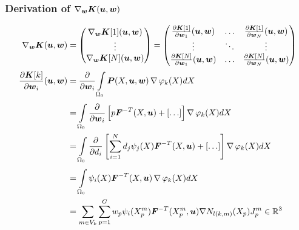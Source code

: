 \subsubsection{Derivation of $\nabla_{\vw}\vK(\vu,\vw)$}
\begin{align*}
	\nabla_{\vw}\vK(\vu,\vw) &= \m{\nabla_{\vw}\vK[1](\vu,\vw)\\ \vdots \\ \nabla_{\vw}\vK[N](\vu,\vw)}
	 = \m{\d{\vK[1]}{\vw_1}(\vu,\vw) & \ldots & \d{\vK[1]}{\vw_N}(\vu,\vw)\\
	 	\vdots & \ddots & \vdots\\
	   \d{\vK[N]}{\vw_1}(\vu,\vw) & \ldots & \d{\vK[N]}{\vw_N}(\vu,\vw)}\\
	\d{\vK[k]}{\vw_i}(\vu,\vw) &= \d{}{\vw_i} \intor\vP(X,\vu,\vw)\divergence\varphi_k(X) dX\\
		&=  \intor\d{}{\vw_i} \left[p\vF^{-T}(X,\vu) +[\ldots] \right] \divergence\varphi_k(X) dX\\
		&=  \intor\d{}{d_i} \left[\sumi d_j\psi_j(X)\vF^{-T}(X,\vu) +[\ldots] \right] \divergence\varphi_k(X) dX\\
		&=  \intor \psi_i(X)\vF^{-T}(X,\vu)\divergence\varphi_k(X) dX\\
		&= \sumvk\sumgp w_p \psi_i(\pmp)\vF^{-T}(\pmp,\vu) \nabla N_{l(k,m)}(X_p)\jmp\in\R^3
\end{align*}
